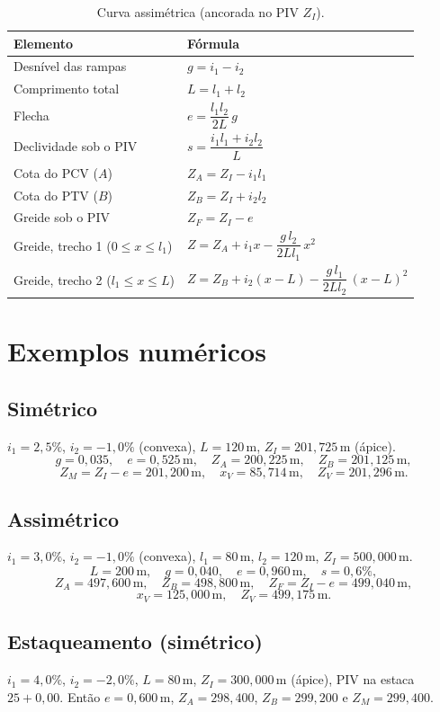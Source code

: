 \documentclass[11pt,a4paper]{article}
\newcommand{\m}{\,\text{m}}
\begin{document}
\begin{table}[h]
\centering
\caption{Curva assimétrica (ancorada no PIV $Z_I$).}
\begin{tabular}{ll}
\toprule
Elemento & Fórmula \\
\midrule
Desnível das rampas & $g = i_1 - i_2$ \\
Comprimento total & $L = l_1 + l_2$ \\
Flecha & $e = \dfrac{l_1 l_2}{2L}\,g$ \\
Declividade sob o PIV & $s = \dfrac{i_1 l_1 + i_2 l_2}{L}$ \\
Cota do PCV ($A$) & $Z_A = Z_I - i_1 l_1$ \\
Cota do PTV ($B$) & $Z_B = Z_I + i_2 l_2$ \\
Greide sob o PIV & $Z_F = Z_I - e$ \\
Greide, trecho 1 ($0\le x\le l_1$) & $Z = Z_A + i_1 x - \dfrac{g\,l_2}{2L l_1}\,x^2$ \\
Greide, trecho 2 ($l_1\le x\le L$) & $Z = Z_B + i_2(x-L) - \dfrac{g\,l_1}{2L l_2}\,(x-L)^2$ \\
\bottomrule
\end{tabular}
\end{table}

\section{Exemplos numéricos}

\subsection*{Simétrico}
$i_1=2{,}5\%$, $i_2=-1{,}0\%$ (convexa), $L=120\m$, $Z_I=201{,}725\m$ (ápice).
\[
g=0{,}035,\quad e=0{,}525\m,\quad Z_A=200{,}225\m,\quad Z_B=201{,}125\m,
\]
\[
Z_M=Z_I-e=201{,}200\m,\quad x_V=85{,}714\m,\quad Z_V=201{,}296\m.
\]

\subsection*{Assimétrico}
$i_1=3{,}0\%$, $i_2=-1{,}0\%$ (convexa), $l_1=80\m$, $l_2=120\m$, $Z_I=500{,}000\m$.
\[
L=200\m,\quad g=0{,}040,\quad e=0{,}960\m,\quad s=0{,}6\%,
\]
\[
Z_A=497{,}600\m,\quad Z_B=498{,}800\m,\quad Z_F=Z_I-e=499{,}040\m,
\]
\[
x_V=125{,}000\m,\quad Z_V=499{,}175\m.
\]

\subsection*{Estaqueamento (simétrico)}
$i_1=4{,}0\%$, $i_2=-2{,}0\%$, $L=80\m$, $Z_I=300{,}000\m$ (ápice), PIV na
estaca $25+0{,}00$. Então $e=0{,}600\m$, $Z_A=298{,}400$, $Z_B=299{,}200$ e
$Z_M=299{,}400$.
\end{document}
